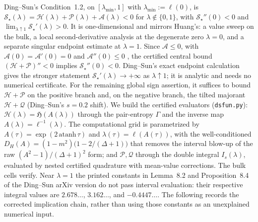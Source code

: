 \documentclass[11pt]{article}
\begin{document}
Ding--Sun's Condition~1.2, on
$[\lambda_{\min},1]$ with $\lambda_{\min}:=\ell(0)$, is
$\mathscr S_\star(\lambda)=\mathcal H(\lambda)
+\mathcal P(\lambda)+\mathcal A(\lambda)<0$ for $\lambda\notin\{0,1\}$,
with $\mathscr S_\star''(0)<0$ and
$\lim_{\lambda\uparrow1}\mathscr S_\star'(\lambda)>0$.
It is
one-dimensional and mirrors Huang's: a value sweep on the bulk, a local
second-derivative analysis at the degenerate zero $\lambda=0$, and
a separate singular endpoint estimate at $\lambda=1$.
Since $\mathcal A\le 0$, with
$\mathcal A(0)=\mathcal A'(0)=0$ and $\mathcal A''(0)\le0$
\cite[discussion following eq.~(2.35)]{ding2018capacity}, the certified
central bound $(\mathcal H+\mathcal P)''<0$ implies
$\mathscr S_\star''(0)<0$. Ding--Sun's exact endpoint calculation
\cite[proof of Theorem~1.4]{ding2018capacity} gives the
stronger statement $\mathscr S_\star'(\lambda)\to+\infty$ as
$\lambda\uparrow1$; it is analytic and needs no numerical certificate. For
the remaining global sign assertion, it suffices to bound
$\mathcal H+\mathcal P$ on the
positive branch and, on the negative branch, the tilted majorant
$\mathcal H+\mathcal Q$ (Ding--Sun's $s=0.2$ shift). We build the certified
evaluators (\texttt{dsfun.py}): $\mathcal H(\lambda)=\mathfrak H(A(\lambda))$
through the pair-entropy $\Gamma$ and the inverse map
$A(\lambda)=\ell^{-1}(\lambda)$. The computational grid is parametrized by
$A(\tau)=\exp(2\,\mathrm{atanh}\,\tau)$ and
$\lambda(\tau)=\ell(A(\tau))$,
with the well-conditioned $D_H(A)=(1-m^2)\bigl(1-2/(\Delta+1)\bigr)$ that
removes the interval blow-up of the raw $(A^2-1)/(\Delta+1)^2$ form; and
$\mathcal P,\mathcal Q$ through the double integral $I_s(\lambda)$, evaluated
by nested certified quadrature with mean-value corrections. The bulk cells
verify. Near $\lambda=1$ the printed constants in Lemma~8.2 and
Proposition~8.4 of the Ding--Sun arXiv version do not pass interval evaluation:
their respective integral
values are $2.678\ldots$, $3.162\ldots$, and $-0.4447\ldots$.  The following
records the corrected implication chain, rather than using those constants as
an unexplained numerical input.
\end{document}
